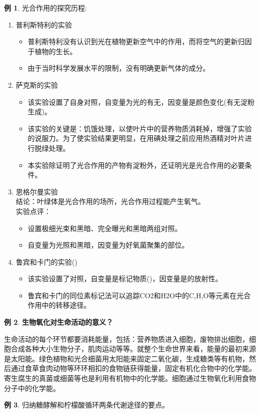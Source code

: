 \documentclass[UTF8]{article}
\theoremstyle{definition}
\newtheorem{example}{例}[section]
\begin{document}
\begin{example}
    光合作用的探究历程: \begin{enumerate}
        \item 普利斯特利的实验\begin{itemize}
            \item 普利斯特利没有认识到光在植物更新空气中的作用，而将空气的更新归因于植物的生长。\item 由于当时科学发展水平的限制，没有明确更新气体的成分。
        \end{itemize}
        \item 萨克斯的实验\begin{itemize}
            \item 该实验设置了自身对照，自变量为光的有无，因变量是颜色变化(有无淀粉生成)。\item 该实验的关键是：饥饿处理，以使叶片中的营养物质消耗掉，增强了实验的说服力。为了使实验结果更明显，在用碘处理之前应用热酒精对叶片进行脱绿处理。\item 本实验除证明了光合作用的产物有淀粉外，还证明光是光合作用的必要条件。
        \end{itemize}
        \item 恩格尔曼实验\\ 结论：叶绿体是光合作用的场所，光合作用过程能产生氧气。\\ 实验点评：\begin{itemize}
            \item 设置极细光束和黑暗、完全曝光和黑暗两组对照。\item 自变量为光照和黑暗，因变量为好氧菌聚集的部位。
        \end{itemize}
        \item 鲁宾和卡门的实验()\begin{itemize}
            \item 该实验设置了对照，自变量是标记物质()，因变量是的放射性。\item 鲁宾和卡门的同位素标记法可以追踪CO2和H2O中的C,H,O等元素在光合作用中的转移途径。
        \end{itemize}
    \end{enumerate}
\end{example}\begin{example}\textbf{生物氧化对生命活动的意义？}
    
    生命活动的每个环节都要消耗能量，包括：营养物质进入细胞，废物排出细胞，细胞合成各种大小生物分子，肌肉运动等等。就整个生命世界来看，能量的最初来源是太阳能。绿色植物和光合细菌用太阳能来固定二氧化碳，生成糖类等有机物，然后通过食草食肉动物等环环相扣的食物链获得能量，固定有机化合物中的化学能。寄生腐生的真菌或细菌等也是利用有机物中的化学能。细胞通过生物氧化利用食物分子中的化学能。
\end{example}\begin{example}归纳糖酵解和柠檬酸循环两条代谢途径的要点。
    

\end{example}
\end{document}
